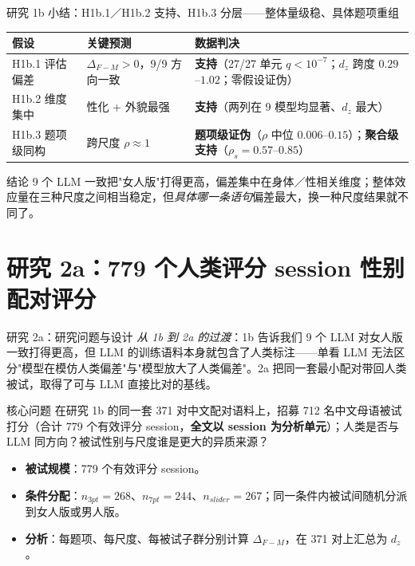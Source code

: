 \documentclass[aspectratio=169,professionalfonts]{beamer}
\begin{document}
{
\begin{frame}{研究 1b 小结：H1b.1／H1b.2 支持、H1b.3 分层——整体量级稳、具体题项重组}
  \footnotesize
  \setlength{\tabcolsep}{4pt}
  \begin{table}
    \centering
    \begin{tabular}{lll}
      \toprule
      假设 & 关键预测 & 数据判决 \\
      \midrule
      H1b.1 评估偏差 & $\Delta_{F-M}>0$，9/9 方向一致 & \textbf{支持}（27/27 单元 $q<10^{-7}$；$d_z$ 跨度 $0.29$--$1.02$；零假设证伪） \\
      H1b.2 维度集中 & 性化 + 外貌最强 & \textbf{支持}（两列在 9 模型均显著、$d_z$ 最大） \\
      H1b.3 题项级同构 & 跨尺度 $\rho \approx 1$ & \textbf{题项级证伪}（$\rho$ 中位 $0.006$--$0.15$）；\textbf{聚合级支持}（$\rho_s = 0.57$--$0.85$） \\
      \bottomrule
    \end{tabular}
  \end{table}

  \vspace{0.3em}
  \begin{block}{结论}
    \small 9 个 LLM 一致把"女人版"打得更高，偏差集中在身体／性相关维度；整体效应量在三种尺度之间相当稳定，但\emph{具体哪一条语句}偏差最大，换一种尺度结果就不同了。
  \end{block}
\end{frame}
}

\section{研究 2a：779 个人类评分 session 性别配对评分}

\begin{frame}{研究 2a：研究问题与设计}
  \small\emph{从 1b 到 2a 的过渡}：1b 告诉我们 9 个 LLM 对女人版一致打得更高，但 LLM 的训练语料本身就包含了人类标注——单看 LLM 无法区分"模型在模仿人类偏差"与"模型放大了人类偏差"。2a 把同一套最小配对带回人类被试，取得了可与 LLM 直接比对的基线。

  \begin{block}{核心问题}
    \small 在研究 1b 的同一套 371 对中文配对语料上，招募 712 名中文母语被试打分（合计 779 个有效评分 session，\textbf{全文以 session 为分析单元}）；人类是否与 LLM 同方向？被试性别与尺度谁是更大的异质来源？
  \end{block}

  \begin{itemize}
    \item \textbf{被试规模}：779 个有效评分 session。
    \item \textbf{条件分配}：$n_{3pt} = 268$、$n_{7pt} = 244$、$n_{slider} = 267$；同一条件内被试间随机分派到女人版或男人版。
    \item \textbf{分析}：每题项、每尺度、每被试子群分别计算 $\Delta_{F-M}$，在 371 对上汇总为 $d_z$。
  \end{itemize}
\end{frame}
\end{document}
